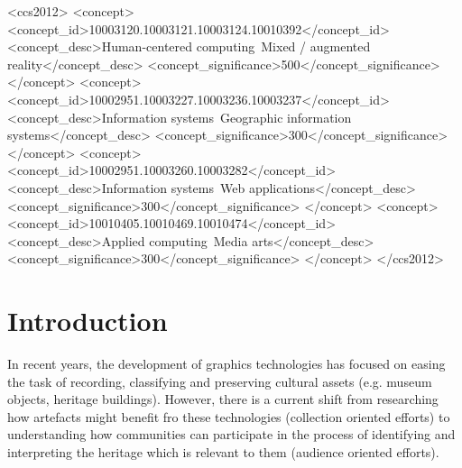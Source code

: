 \documentclass[acmlarge,screen,dvipsnames]{acmart}
\begin{document}
\begin{CCSXML} <ccs2012> <concept>
<concept_id>10003120.10003121.10003124.10010392</concept_id>
<concept_desc>Human-centered computing~Mixed / augmented
reality</concept_desc> <concept_significance>500</concept_significance>
</concept> <concept>
<concept_id>10002951.10003227.10003236.10003237</concept_id>
<concept_desc>Information systems~Geographic information
systems</concept_desc> <concept_significance>300</concept_significance>
</concept> <concept> <concept_id>10002951.10003260.10003282</concept_id>
<concept_desc>Information systems~Web applications</concept_desc>
<concept_significance>300</concept_significance> </concept> <concept>
<concept_id>10010405.10010469.10010474</concept_id> <concept_desc>Applied
computing~Media arts</concept_desc>
<concept_significance>300</concept_significance> </concept> </ccs2012>
\end{CCSXML}

  

\maketitle
\section{Introduction} In recent years, the development of graphics
technologies has focused on easing the task of recording, classifying and
preserving cultural assets (e.g. museum objects, heritage buildings). However,
there is a current shift from researching how artefacts might benefit fro these technologies (collection oriented efforts) to understanding how communities can
participate in the process of identifying and interpreting the heritage which is relevant to them (audience oriented efforts). 



\end{document}
